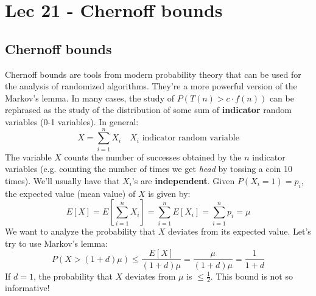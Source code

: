 \chapter{Lec 21 - Chernoff bounds}

\section{Chernoff bounds}
Chernoff bounds are tools from modern probability theory that can be used for the analysis of randomized algorithms. They're a more powerful version of the Markov's lemma.\newline\newline
In many cases, the study of $P(T(n) > c \cdot f(n))$ can be rephrased as the study of the distribution of some sum of \textbf{indicator} random variables (0-1 variables). In general:
\[X = \sum_{i = 1}^n X_i \quad \text{$X_i$ indicator random variable}\]
The variable $X$ counts the number of successes obtained by the $n$ indicator variables (e.g. counting the number of times we get \textit{head} by tossing a coin 10 times). We'll usually have that $X_i$'s are \textbf{independent}.\newline\newline
Given $P(X_i = 1) = p_i$, the expected value (mean value) of $X$ is given by:
\[E[X] = E\left[\sum_{i=1}^n X_i\right] = \sum_{i=1}^n E[X_i] = \sum_{i=1}^np_i = \mu\]
We want to analyze the probability that $X$ deviates from its expected value. Let's try to use Markov's lemma:
\[P(X > (1 + d)\mu) \leq \frac{E[X]}{(1+d)\mu} = \frac{\mu}{(1+d)\mu} = \frac{1}{1+d}\]
If $d = 1$, the probability that $X$ deviates from $\mu$ is $\leq \frac{1}{2}$. This bound is not so informative!

